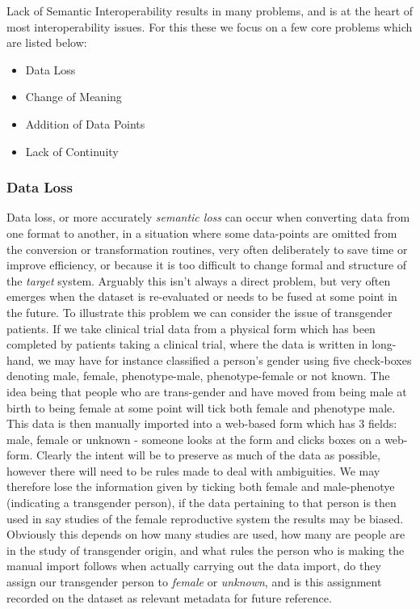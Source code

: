 \documentclass[a4paper,twoside]{article}
\begin{document}
Lack of Semantic Interoperability results in many problems, and is at the heart of most interoperability issues. For this these we focus on a few core problems which are listed below:
\begin{itemize}
	\item Data Loss
	\item Change of Meaning
	\item Addition of Data Points
	\item Lack of Continuity 
\end{itemize}

\subsubsection{Data Loss}

Data loss, or more accurately \emph{semantic loss} can occur when converting data from one format to another, in a situation where some data-points are omitted from the conversion or transformation routines, very often deliberately to save time or improve efficiency, or because it is too difficult to change formal and structure of the \emph{target} system. Arguably this isn't always a direct problem, but very often emerges when the dataset is re-evaluated or needs to be fused at some point in the future. To illustrate this problem we can consider the issue of transgender patients. If we take clinical trial data from a physical form which has been completed by patients taking a clinical trial, where the data is written in long-hand, we may have for instance classified a  person's gender using five check-boxes denoting male, female, phenotype-male, phenotype-female or not known. The idea being that people who are trans-gender and have moved from being male at birth to being female at some point will tick both female and phenotype male. This data is then manually imported into a web-based form which has 3 fields: male, female or unknown - someone looks at the form and clicks boxes on a web-form.  Clearly the intent will be to preserve as much of the data as possible, however there will need to be rules made to deal with ambiguities.  We may therefore lose the information given by ticking both female and male-phenotye (indicating a transgender person), if the data pertaining to that person is then used in say studies of the female reproductive system the results may be biased.  Obviously this depends on how many studies are used, how many are people are in the study of transgender origin, and what rules the person who is making the manual import follows when actually carrying out the data import, do they assign our transgender person to \emph{female} or \emph{unknown}, and is this assignment recorded on the dataset as relevant metadata for future reference.
\end{document}
